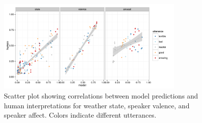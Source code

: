 \documentclass[10pt,letterpaper]{article}
\begin{document}
%
\begin{figure}[t]
\centering
\includegraphics[width=260pt, height=130pt]{scatter.pdf}
\caption{Scatter plot showing correlations between model predictions and human interpretations for weather state, speaker valence, and speaker affect. Colors indicate different utterances.}
\label{scatter}
\end{figure}
\end{document}
